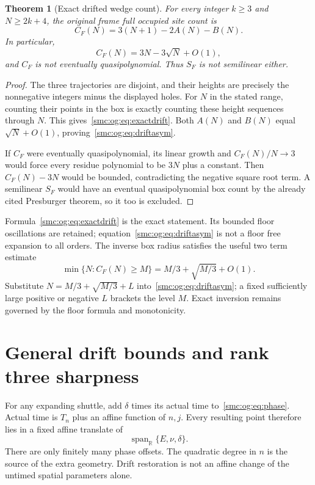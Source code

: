 \documentclass[11pt,letterpaper]{article}
\numberwithin{equation}{section}
\newtheorem{theorem}{Theorem}[section]
\theoremstyle{definition}
\theoremstyle{remark}
\newcommand{\R}{\mathbb R}
\begin{document}
\begin{theorem}[Exact drifted wedge count]\label{smc:og:thm:exactdrift}
For every integer $k\ge3$ and $N\ge2k+4$, the original frame full occupied site count is
\begin{equation}\label{smc:og:eq:exactdrift}
 C_F(N)=3(N+1)-2A(N)-B(N).
\end{equation}
In particular,
\begin{equation}\label{smc:og:eq:driftasym}
 C_F(N)=3N-3\sqrt N+O(1),
\end{equation}
and $C_F$ is not eventually quasipolynomial. Thus $S_F$ is not semilinear either.
\end{theorem}
\begin{proof}
The three trajectories are disjoint, and their heights are precisely the nonnegative integers minus the displayed holes. For $N$ in the stated range, counting their points in the box is exactly counting these height sequences through $N$. This gives~\eqref{smc:og:eq:exactdrift}. Both $A(N)$ and $B(N)$ equal $\sqrt N+O(1)$, proving~\eqref{smc:og:eq:driftasym}.

If $C_F$ were eventually quasipolynomial, its linear growth and $C_F(N)/N\to3$ would force every residue polynomial to be $3N$ plus a constant. Then $C_F(N)-3N$ would be bounded, contradicting the negative square root term. A semilinear $S_F$ would have an eventual quasipolynomial box count by the already cited Presburger theorem, so it too is excluded.
\end{proof}
Formula~\eqref{smc:og:eq:exactdrift} is the exact statement. Its bounded floor oscillations are retained; equation~\eqref{smc:og:eq:driftasym} is not a floor free expansion to all orders. The inverse box radius satisfies the useful two term estimate
\begin{equation}\label{smc:og:eq:driftinverse}
 \min\{N:C_F(N)\ge M\}=M/3+\sqrt{M/3}+O(1).
\end{equation}
Substitute $N=M/3+\sqrt{M/3}+L$ into~\eqref{smc:og:eq:driftasym}; a fixed sufficiently large positive or negative $L$ brackets the level $M$. Exact inversion remains governed by the floor formula and monotonicity.

\section{General drift bounds and rank three sharpness}\label{smc:og:sec:rankthree}
For any expanding shuttle, add $\delta$ times its actual time to~\eqref{smc:og:eq:phase}. Actual time is $T_n$ plus an affine function of $n,j$. Every resulting point therefore lies in a fixed affine translate of
\[
 \operatorname{span}_{\R}\{E,\nu,\delta\}.
\]
There are only finitely many phase offsets. The quadratic degree in $n$ is the source of the extra geometry. Drift restoration is not an affine change of the untimed spatial parameters alone.
\end{document}
